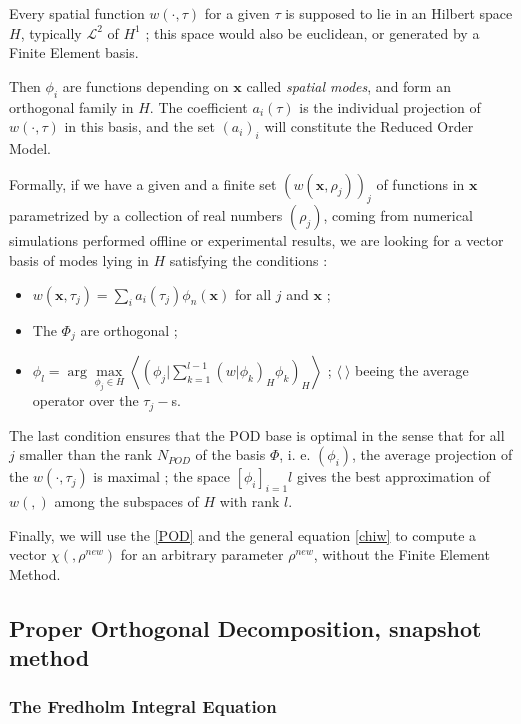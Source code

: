 \ligneinter
Every spatial function $w(\cdot,\tau)$ for a given $\tau$ is supposed to lie in an Hilbert space $H$, %
typically $\mathcal{L}^2$ of $H^1$ ; this space would also be euclidean, or generated by a Finite Element basis.

\par
Then $\phi_i$ are functions depending on $\mathbf{x}$ called \emph{spatial modes}, and form an orthogonal family in $H$. %
The coefficient $a_i(\tau)$ is the individual projection of $w(\cdot,\tau)$ in this basis, %
and the set $(a_i)_i$ will constitute the Reduced Order Model.

\ligneinter
Formally, if we have a given and a finite set $(w(\mathbf{x},\rho_j))_j$ of functions in $\mathbf{x}$ parametrized by a collection of real numbers $(\rho_j)$, %
coming from numerical simulations performed \og{} offline \fg{} or experimental results, we are looking for a vector basis of modes lying in %
$H$ %
satisfying the conditions :

\begin{itemize}
\item $w(\mathbf{x},\tau_j)=\sum\limits_i a_i(\tau_j)\phi_n(\mathbf{x})$ for all $j$ and $\mathbf{x}$ ;
\item The $\Phi_j$ are orthogonal ;
\item $\phi_l= \arg\max\limits_{\phi_j\in H}\left\langle\left(\phi_j|\sum\limits_{k=1}^{l-1}\left(w|\phi_k\right)_H\phi_k\right)_H\right\rangle$ ; %
$\langle \ \rangle$ beeing the average operator over the $\tau_j-$s.
\end{itemize}

The last condition ensures that the POD base is optimal in the sense that for all $j$ smaller than the rank $N_{POD}$ of the basis $\Phi$, i. e. $(\phi_i)$, %
the average projection of the $w(\cdot , \tau_j)$ is maximal ; %
the space $[\phi_i]_{i=1}{l}$ gives the best approximation of $w(,)$ among the subspaces of $H$ with rank $l$.

\etoile
Finally, we will use the \ref{POD} and the general equation \ref{chiw} to compute a vector $\chi(,\rho^{new})$ for an arbitrary parameter $\rho^{new}$, %
without the Finite Element Method.

\subsection{Proper Orthogonal Decomposition, snapshot method}

\subsubsection{The Fredholm Integral Equation}

